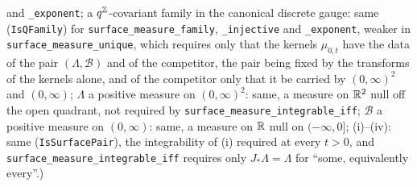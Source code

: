 \begin{theorem}
{and \texttt{\_exponent}; a $q^{\mathbb{Z}}$-covariant family in the canonical discrete gauge: same
(\texttt{IsQFamily}) for \texttt{surface\_measure\_family}, \texttt{\_injective} and
\texttt{\_exponent}, weaker in \texttt{surface\_measure\_unique}, which requires only that the kernels
$\mu_{0,t}$ have the data of the pair $(\Lambda, \mathcal{B})$ and of the competitor, the pair being
fixed by the transforms of the kernels alone, and of the competitor only that it be carried by
$(0,\infty)^2$ and $(0,\infty)$; $\Lambda$ a positive measure on $(0,\infty)^2$: same, a measure on
$\mathbb{R}^2$ null off the open quadrant, not required by \texttt{surface\_measure\_integrable\_iff};
$\mathcal{B}$ a positive measure on $(0,\infty)$: same, a measure on $\mathbb{R}$ null on $(-\infty,0]$;
(i)--(iv): same (\texttt{IsSurfacePair}), the integrability of (i) required at every $t > 0$, and
\texttt{surface\_measure\_integrable\_iff} requires only $J_*\Lambda = \Lambda$ for ``some, equivalently
every''.)}
\end{theorem}


